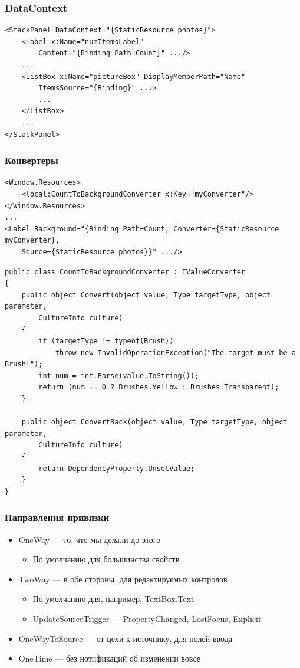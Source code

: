 \documentclass[xetex,mathserif,serif]{beamer}
\begin{document}
	\begin{frame}[fragile]
		\frametitle{DataContext}
		\begin{footnotesize}
			\begin{verbatim}
<StackPanel DataContext="{StaticResource photos}">
    <Label x:Name="numItemsLabel"
        Content="{Binding Path=Count}" .../>
    ...
    <ListBox x:Name="pictureBox" DisplayMemberPath="Name"
        ItemsSource="{Binding}" ...>
        ...
    </ListBox>
    ...
</StackPanel>
			\end{verbatim}
		\end{footnotesize}
	\end{frame}

	\begin{frame}[fragile]
		\frametitle{Конвертеры}
		\begin{ssmall}
			\begin{verbatim}
<Window.Resources>
    <local:CountToBackgroundConverter x:Key="myConverter"/>
</Window.Resources>
...
<Label Background="{Binding Path=Count, Converter={StaticResource myConverter},
    Source={StaticResource photos}}" .../>
			\end{verbatim}
			\vspace{3mm}
			\begin{verbatim}
public class CountToBackgroundConverter : IValueConverter
{
    public object Convert(object value, Type targetType, object parameter,
        CultureInfo culture)
    {
        if (targetType != typeof(Brush))
            throw new InvalidOperationException("The target must be a Brush!");
        int num = int.Parse(value.ToString());
        return (num == 0 ? Brushes.Yellow : Brushes.Transparent);
    }

    public object ConvertBack(object value, Type targetType, object parameter,
        CultureInfo culture)
    {
        return DependencyProperty.UnsetValue;
    }
}
			\end{verbatim}
		\end{ssmall}
	\end{frame}

	\begin{frame}
		\frametitle{Направления привязки}
		\begin{itemize}
			\item OneWay --- то, что мы делали до этого
			\begin{itemize}
				\item По умолчанию для большинства свойств
			\end{itemize}
			\item TwoWay --- в обе стороны, для редактируемых контролов
			\begin{itemize}
				\item По умолчанию для, например, TextBox.Text
				\item UpdateSourceTrigger --- PropertyChanged, LostFocus, Explicit
			\end{itemize}
			\item OneWayToSource --- от цели к источнику, для полей ввода
			\item OneTime --- без нотификаций об изменении вовсе
		\end{itemize}
	\end{frame}
\end{document}

